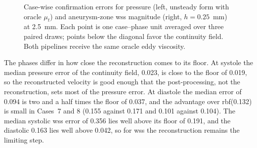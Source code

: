 \documentclass[12pt,a4paper]{article}
\newcommand{\WSS}{\ac{wss}\xspace}
\newcommand{\RBF}{\ac{rbf}\xspace}
\theoremstyle{definition}
\numberwithin{equation}{section}
\begin{document}
\begin{figure}[!htb]
\centering
\begin{minipage}{0.48\textwidth}
\centering
{}
\end{minipage}
\hfill
\begin{minipage}{0.48\textwidth}
\centering
{}
\end{minipage}
\caption{Case-wise confirmation errors for pressure (left, unsteady form with oracle $\mu_t$) and aneurysm-zone \WSS magnitude (right, $h=0.25$~mm) at 2.5~mm. Each point is one case--phase unit averaged over three paired draws; points below the diagonal favor the continuity field. Both pipelines receive the same oracle eddy viscosity.}
\label{fig:confirmation}
\end{figure}

The phases differ in how close the reconstruction comes to its floor. At systole the median pressure error of the continuity field, 0.023, is close to the floor of 0.019, so the reconstructed velocity is good enough that the post-processing, not the reconstruction, sets most of the pressure error. At diastole the median error of 0.094 is two and a half times the floor of 0.037, and the advantage over \RBF (0.132) is small in Cases~7 and 8 (0.155 against 0.171 and 0.101 against 0.104). The median systolic \WSS error of 0.356 lies well above its floor of 0.191, and the diastolic 0.163 lies well above 0.042, so for \WSS the reconstruction remains the limiting step.
\end{document}
